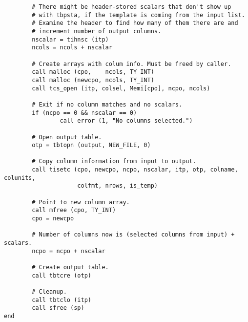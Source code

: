 \begin{verbatim}
        # There might be header-stored scalars that don't show up
        # with tbpsta, if the template is coming from the input list.
        # Examine the header to find how many of them there are and 
        # increment number of output columns.
        nscalar = tihnsc (itp)
        ncols = ncols + nscalar

        # Create arrays with colum info. Must be freed by caller.
        call malloc (cpo,    ncols, TY_INT)
        call malloc (newcpo, ncols, TY_INT)
        call tcs_open (itp, colsel, Memi[cpo], ncpo, ncols)

        # Exit if no column matches and no scalars.
        if (ncpo == 0 && nscalar == 0)
                call error (1, "No columns selected.")

        # Open output table.
        otp = tbtopn (output, NEW_FILE, 0)

        # Copy column information from input to output.
        call tisetc (cpo, newcpo, ncpo, nscalar, itp, otp, colname, colunits, 
                     colfmt, nrows, is_temp)

        # Point to new column array.
        call mfree (cpo, TY_INT)
        cpo = newcpo

        # Number of columns now is (selected columns from input) + scalars.
        ncpo = ncpo + nscalar

        # Create output table.
        call tbtcre (otp)

        # Cleanup.
        call tbtclo (itp)
        call sfree (sp)
end
\end{verbatim}
\newpage
{}
